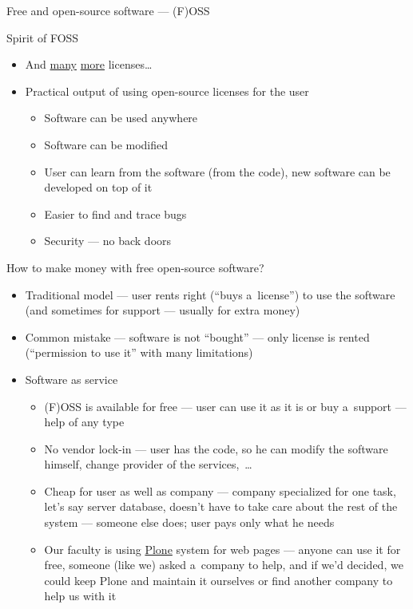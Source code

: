 \documentclass[compress, ucs, xelatex, 11pt, xcolor=svgnames, aspectratio=169,
	hyperref={
		bookmarks=true,
		unicode=true,
		colorlinks=true,
		pdftitle={Linux, command line and MetaCentrum},
		plainpages=false,
		pdfauthor={Vojtech Zeisek},
		pdfsubject={Course about use of Linux command line, writing shell scripts and using MetaCentrum of CESNET},
		pdfcreator={XeLaTeX},
		pdfkeywords={Linux, GNU, BASH, shell, command line, MetaCentrum},
		linkcolor=DarkRed, %
		anchorcolor=DarkBlue, %
		citecolor=Indigo, %
		filecolor=NavyBlue, %
		menucolor=DarkMagenta, %
		urlcolor=DarkBlue, %
		pdftex},
	url={hyphens, lowtilde} %
	]{beamer}
\begin{document}
\begin{frame}[allowframebreaks]{Free and open-source software --- (F)OSS}
\begin{block}{Spirit of FOSS}
\begin{itemize}
		\end{itemize}
	\end{block}
	\begin{itemize}
		\item And \href{https://en.wikipedia.org/wiki/Comparison_of_free_and_open-source_software_licenses}{many} \href{https://opensource.org/licenses}{more} licenses\ldots
		\item Practical output of using open-source licenses for the user
		\begin{itemize}
			\item Software can be used anywhere
			\item Software can be modified
			\item User can learn from the software (from the code), new software can be developed on top of it
			\item Easier to find and trace bugs
			\item Security --- no back doors
		\end{itemize}
	\end{itemize}
\end{frame}

\begin{frame}{How to make money with free open-source software?}
	\begin{itemize}
		\item Traditional model --- user rents right (\enquote{buys a~license}) to use the software (and sometimes for support --- usually for extra money)
		\item Common mistake --- software is not \enquote{bought} --- only license is rented (\enquote{permission to use it} with many limitations)
		\item Software as service
		\begin{itemize}
			\item (F)OSS is available for free --- user can use it as it is or buy a~support --- help of any type
			\item No vendor lock-in --- user has the code, so he can modify the software himself, change provider of the services,~\ldots
			\item Cheap for user as well as company --- company specialized for one task, let's say server database, doesn't have to take care about the rest of the system --- someone else does; user pays only what he needs
			\item Our faculty is using \href{https://plone.org/}{Plone} system for web pages --- anyone can use it for free, someone (like we) asked a~company to help, and if we'd decided, we  could keep Plone and maintain it ourselves or find another company to help us with it
		\end{itemize}
	\end{itemize}
\end{frame}
\end{document}
